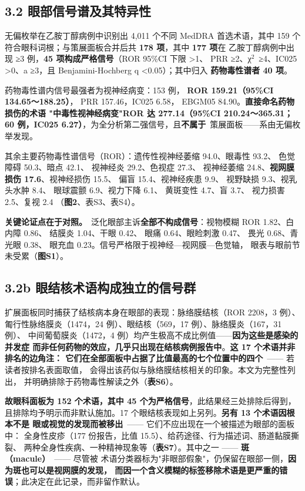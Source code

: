 \documentclass[UTF8,fontset=windows,11pt]{ctexart}
\begin{document}
\subsection{3.2 眼部信号谱及其特异性}

无偏枚举在乙胺丁醇病例中识别出 4,011 个不同 MedDRA 首选术语，其中 159 个符合眼科词根；与策展面板合并后共 \textbf{178 项}，其中 \textbf{177 项}在 乙胺丁醇病例中出现 ≥3 例，\textbf{45 项构成严格信号}（ROR 95\%CI 下限 >1、 PRR ≥2、χ$^{2}$\ ≥4、IC025 >0、a ≥3，且 Benjamini-Hochberg q <0.05）；其中归入 \textbf{药物毒性谱者 40 项}。

药物毒性谱内信号最强者为视神经病变：153 例， \textbf{ROR 159.21（95\%CI 134.65～188.25）}， PRR 157.46，IC025 6.58， EBGM05 84.90。\textbf{直接命名药物损伤的术语 "中毒性视神经病变"ROR 达 277.14（95\%CI 210.24～365.31； 60 例，IC025 6.27）}，为全分析第二强信号，且\textbf{不属于}\ 策展面板——系由无偏枚举发现。

其余主要药物毒性谱信号（ROR）：遗传性视神经萎缩 94.0、眼毒性 93.2、 色觉障碍 50.3、暗点 42.1、 视神经炎 29.2、色视症 27.3、 视神经萎缩 24.8、\textbf{视网膜损伤 17.6}、视神经损伤 15.5、 偏盲 15.4、视神经疾患 9.9、 视野缺损 9.3、视乳头水肿 8.4、 眼球震颤 6.9、视力下降 6.1、 黄斑变性 4.7、盲 3.7、 视力损害 2.5、复视 2.4 （\textbf{图2}、表S3、表S4）。

\textbf{关键论证点在于对照。}\ 泛化眼部主诉\textbf{全部不构成信号}：视物模糊 ROR 1.82、白内障 0.86、 结膜炎 1.04、干眼 0.42、 眼痛 0.64、眼睑刺激 0.47、 畏光 0.68、青光眼 0.38、 眼充血 0.23。信号严格限于视神经—视网膜—色觉轴， 眼表与眼前节未受累（\textbf{图S1}）。

\subsection{3.2b 眼结核术语构成独立的信号群}

扩展面板同时捕获了结核病本身在眼部的表现：脉络膜结核（ROR 2208，3 例）、 匍行性脉络膜炎（1474，24 例）、眼结核（569，17 例）、脉络膜炎（167，31 例）、 中间葡萄膜炎（1472，4 例）均产生极高不成比例值——\textbf{因为这些是感染的并发症 而非任何药物的效应，几乎只出现在结核病例报告中}。\textbf{这 17 个术语并非排名的边角注： 它们在全部面板中占据了比值最高的七个位置中的四个}\ —— 若读者按排名表面取值， 会得出该药似与脉络膜结核相关的印象。本文为完整性列出， 并明确排除于药物毒性解读之外（\textbf{表S6}）。

\textbf{故眼科面板为 152 个术语，其中 45 个为严格信号}，此结果经三处排除后得到， 且排除均予明示而非默认施加。17 个眼结核表现如上另列。\textbf{另有 13 个术语因根本不是 眼或视觉的发现而被移出}\ —— 它们不应出现在一个被描述为眼部的面板中： 全身性皮疹（177 份报告，比值 15.5）、给药途径、行为描述词、肠道黏膜撕裂、 两种全身性疾病、一种精神现象等（\textbf{表S7}）。其中之一 —— \textbf{斑（macule）}\ —— 尽管被 术语分类器标为"非眼部假象"，仍保留在眼部一侧，\textbf{因为斑也可以是视网膜的发现， 而因一个含义模糊的标签移除术语是更严重的错误}；此决定在此记录，而非留作默认。
\end{document}
